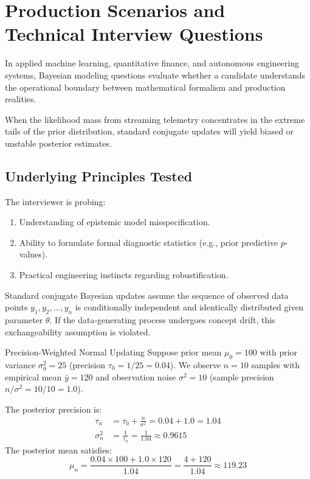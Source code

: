 \section{Production Scenarios and Technical Interview Questions}

In applied machine learning, quantitative finance, and autonomous engineering systems, Bayesian modeling questions evaluate whether a candidate understands the operational boundary between mathematical formalism and production realities.

\begin{interviewbox}
When the likelihood mass from streaming telemetry concentrates in the extreme tails of the prior distribution, standard conjugate updates will yield biased or unstable posterior estimates.
\end{interviewbox}

\subsection*{Underlying Principles Tested}
The interviewer is probing:
\begin{enumerate}
  \item Understanding of epistemic model misspecification.
  \item Ability to formulate formal diagnostic statistics (e.g., prior predictive $p$-values).
  \item Practical engineering instincts regarding robustification.
\end{enumerate}

\begin{assumptionbox}
Standard conjugate Bayesian updates assume the sequence of observed data points $y_1, y_2, \dots, y_n$ is conditionally independent and identically distributed given parameter $\theta$. If the data-generating process undergoes concept drift, this exchangeability assumption is violated.
\end{assumptionbox}

\begin{numericalexample}{Precision-Weighted Normal Updating}
Suppose prior mean $\mu_0 = 100$ with prior variance $\sigma_0^2 = 25$ (precision $\tau_0 = 1/25 = 0.04$). We observe $n = 10$ samples with empirical mean $\bar{y} = 120$ and observation noise $\sigma^2 = 10$ (sample precision $n/\sigma^2 = 10/10 = 1.0$).

The posterior precision is:
\[
  \begin{aligned}
    \tau_n &= \tau_0 + \frac{n}{\sigma^2} = 0.04 + 1.0 = 1.04 \\
    \sigma_n^2 &= \frac{1}{\tau_n} = \frac{1}{1.04} \approx 0.9615
  \end{aligned}
\]
The posterior mean satisfies:
\[
  \mu_n = \frac{0.04 \times 100 + 1.0 \times 120}{1.04} = \frac{4 + 120}{1.04} \approx 119.23
\]
\end{numericalexample}

